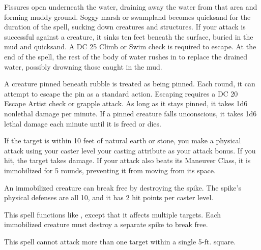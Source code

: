 \begin{spelleffect}
    \par {} Fissures open underneath the water, draining away the water from that area and forming muddy ground. Soggy marsh or swampland becomes quicksand for the duration of the spell, sucking down creatures and structures.  If your attack is successful against a creature, it sinks ten feet beneath the surface, buried in the mud and quicksand. A DC 25 Climb or Swim check is required to escape. At the end of the spell, the rest of the body of water rushes in to replace the drained water, possibly drowning those caught in the mud.
\end{spelleffect}
\begin{spellnotes}
    A creature pinned beneath rubble is treated as being pinned. Each round, it can attempt to escape the pin as a standard action. Escaping requires a DC 20 Escape Artist check or grapple attack. As long as it stays pinned, it takes 1d6 nonlethal damage per minute. If a pinned creature falls unconscious, it takes 1d6 lethal damage each minute until it is freed or dies.
\end{spellnotes}

\begin{spelleffect}
    If the target is within 10 feet of natural earth or stone, you make a physical attack using your caster level \add your casting attribute as your attack bonus. If you hit, the target takes damage. If your attack also beats its Maneuver Class, it is immobilized for 5 rounds, preventing it from moving from its space.

    An immobilized creature can break free by destroying the spike. The spike's physical defenses are all 10, and it has 2 hit points per caster level.
\end{spelleffect}

\begin{spelleffect}
    This spell functions like , except that it affects multiple targets. Each immobilized creature must destroy a separate spike to break free. 
\end{spelleffect}
\begin{spellnotes}
    This spell cannot attack more than one target within a single 5-ft. square.
\end{spellnotes}


